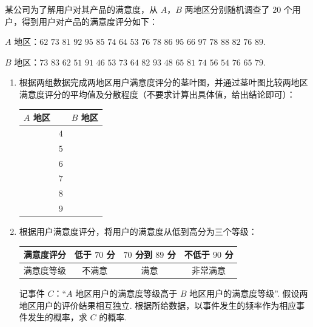 \begin{problem}
某公司为了解用户对其产品的满意度，从 \(A\)，\(B\) 两地区分别随机调查了 \(20\) 个用户，得到用户对产品的满意度评分如下：

\(A\) 地区：\(62\) \(73\) \(81\) \(92\) \(95\) \(85\) \(74\) \(64\) \(53\) \(76\) \(78\) \(86\) \(95\) \(66\) \(97\) \(78\) \(88\) \(82\) \(76\) \(89\).

\(B\) 地区：\(73\) \(83\) \(62\) \(51\) \(91\) \(46\) \(53\) \(73\) \(64\) \(82\) \(93\) \(48\) \(65\) \(81\) \(74\) \(56\) \(54\) \(76\) \(65\) \(79\).

\begin{enumerate}
\item 根据两组数据完成两地区用户满意度评分的茎叶图，并通过茎叶图比较两地区满意度评分的平均值及分散程度（不要求计算出具体值，给出结论即可）：

\begin{center}
\begin{tabular}{c|c|c}
\(A\) 地区 & & \(B\) 地区 \\
\hline
 & \(4\) & \\
 & \(5\) & \\
 & \(6\) & \\
 & \(7\) & \\
 & \(8\) & \\
 & \(9\) & \\
\end{tabular}
\end{center}

\item 根据用户满意度评分，将用户的满意度从低到高分为三个等级：

\begin{center}
\begin{tabular}{|c|c|c|c|}
\hline
满意度评分 & 低于 \(70\) 分 & \(70\) 分到 \(89\) 分 & 不低于 \(90\) 分 \\
\hline
满意度等级 & 不满意 & 满意 & 非常满意 \\
\hline
\end{tabular}
\end{center}

记事件 \(C\)：“\(A\) 地区用户的满意度等级高于 \(B\) 地区用户的满意度等级”. 假设两地区用户的评价结果相互独立. 根据所给数据，以事件发生的频率作为相应事件发生的概率，求 \(C\) 的概率.
\end{enumerate}
\end{problem}

